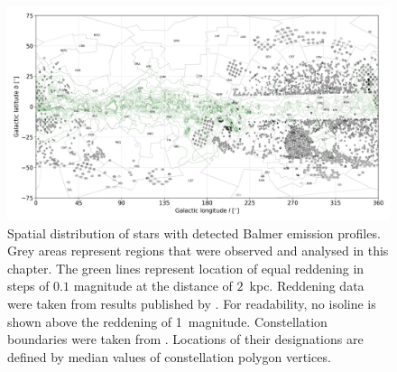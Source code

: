 \begin{figure}
	\centering
	\includegraphics[width=\textwidth]{reddening_d2000_n720_cont_wemisions.png}
	\caption{Spatial distribution of stars with detected Balmer emission profiles. Grey areas represent regions that were observed and analysed in this chapter. The green lines represent location of equal reddening in steps of $0.1$ magnitude at the distance of $2$~kpc. Reddening data were taken from results published by \citet{2017A&A...606A..65C}. For readability, no isoline is shown above the reddening of 1~magnitude. Constellation boundaries were taken from \citet{const_data}. Locations of their designations are defined by median values of constellation polygon vertices.}
	\label{fig:spatialemission}
\end{figure}

